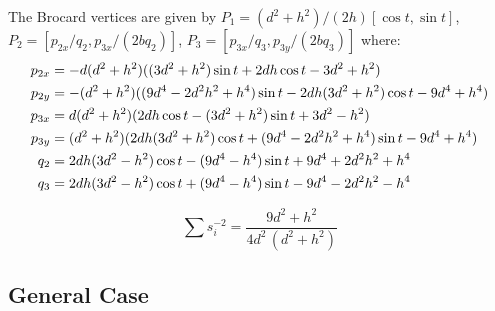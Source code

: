 The Brocard vertices are given by
$P_1=(d^2+h^2)/(2h)[\cos{ t},\sin{t} ]$, $P_2=[p_{2x} /q_2,p_{3x}/(2bq_2)] $, $P_3=[p_{3x} /q_3,p_{3y}/(2bq_3)]$ where:
{\small  
\begin{equation}
    \aligned
    p_{2x} &= -d (d^2 + h^2) ((3 d^2 + h^2)\sin{t} + 2d h \cos{t}- 3 d^2 + h^2) \\
    p_{2y}&=-(d^2 + h^2) ((9 d^4 - 2 d^2 h^2 + h^4)\sin{t} - 2 d h (3 d^2 + h^2)\cos{t} - 9 d^4 + h^4) \\
      p_{3x} &= d (d^2 + h^2) (2 d h \cos{t} - (3 d^2 + h^2) \sin{t} + 3 d^2 - h^2)\\
    p_{3y}&=(d^2 + h^2) (2d h (3 d^2 + h^2) \cos{t}+ (9 d^4 - 2 d^2 h^2 + h^4)\sin{t} - 9 d^4 + h^4) \\
    q_2&= 2 d h (3 d^2 - h^2)\cos{t} - (9 d^4 - h^4) \sin{t}  + 9 d^4 + 2 d^2 h^2 + h^4\\
    q_3&= 2 d h (3 d^2 - h^2)\cos{t} + (9 d^4 - h^4)\sin{t} - 9 d^4 - 2 d^2 h^2 - h^4
\endaligned
\label{eqn:03-vertices-brocard}
\end{equation}
}

\begin{proposition}\label{prop:03-sum-inverse-brocard}
\[ \sum{s_i^{-2}}=\frac{9 d^2 + h^2}{ 4 d^2 \,(d^2 + h^2)}\]
\end{proposition}

\subsection{General Case}

